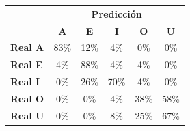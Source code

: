 \begin{tabular}{lccccc}
\toprule
 & \multicolumn{5}{c}{\textbf{Predicción}} \\
 & \textbf{A} & \textbf{E} & \textbf{I} & \textbf{O} & \textbf{U} \\
\midrule
\textbf{Real A} & \cellcolor[rgb]{0.42,0.42,1.00} \color{white} 83\% & \cellcolor[rgb]{0.91,0.91,1.00}  12\% & \cellcolor[rgb]{0.97,0.97,1.00}  4\% & \cellcolor[rgb]{1.00,1.00,1.00}  0\% & \cellcolor[rgb]{1.00,1.00,1.00}  0\% \\
\textbf{Real E} & \cellcolor[rgb]{0.97,0.97,1.00}  4\% & \cellcolor[rgb]{0.38,0.38,1.00} \color{white} 88\% & \cellcolor[rgb]{0.97,0.97,1.00}  4\% & \cellcolor[rgb]{0.97,0.97,1.00}  4\% & \cellcolor[rgb]{1.00,1.00,1.00}  0\% \\
\textbf{Real I} & \cellcolor[rgb]{1.00,1.00,1.00}  0\% & \cellcolor[rgb]{0.82,0.82,1.00}  26\% & \cellcolor[rgb]{0.51,0.51,1.00} \color{white} 70\% & \cellcolor[rgb]{0.97,0.97,1.00}  4\% & \cellcolor[rgb]{1.00,1.00,1.00}  0\% \\
\textbf{Real O} & \cellcolor[rgb]{1.00,1.00,1.00}  0\% & \cellcolor[rgb]{1.00,1.00,1.00}  0\% & \cellcolor[rgb]{0.97,0.97,1.00}  4\% & \cellcolor[rgb]{0.74,0.74,1.00}  38\% & \cellcolor[rgb]{0.59,0.59,1.00} \color{white} 58\% \\
\textbf{Real U} & \cellcolor[rgb]{1.00,1.00,1.00}  0\% & \cellcolor[rgb]{1.00,1.00,1.00}  0\% & \cellcolor[rgb]{0.94,0.94,1.00}  8\% & \cellcolor[rgb]{0.82,0.82,1.00}  25\% & \cellcolor[rgb]{0.53,0.53,1.00} \color{white} 67\% \\
\bottomrule
\end{tabular}